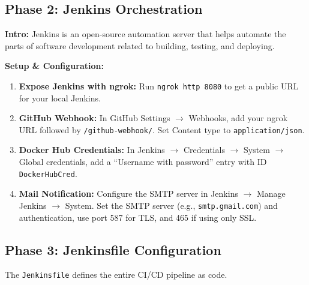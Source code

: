 \documentclass[12pt,a4paper]{article}
\begin{document}

\subsection{Phase 2: Jenkins Orchestration}

\textbf{Intro:} Jenkins is an open-source automation server that helps automate the parts of software development related to building, testing, and deploying.

\textbf{Setup \& Configuration:}
\begin{enumerate}[noitemsep]
  \item \textbf{Expose Jenkins with ngrok:} Run \texttt{ngrok http 8080} to get a public URL for your local Jenkins. %
  \item \textbf{GitHub Webhook:} In GitHub Settings $\rightarrow$ Webhooks, add your ngrok URL followed by \texttt{/github-webhook/}. Set Content type to \texttt{application/json}. %
  \item \textbf{Docker Hub Credentials:} In Jenkins $\rightarrow$ Credentials $\rightarrow$ System $\rightarrow$ Global credentials, add a ``Username with password'' entry with ID \texttt{DockerHubCred}. %
  \item \textbf{Mail Notification:} Configure the SMTP server in Jenkins $\rightarrow$ Manage Jenkins $\rightarrow$ System. Set the SMTP server (e.g., \texttt{smtp.gmail.com}) and authentication, use port 587 for TLS, and 465 if using only SSL. %
\end{enumerate}

\subsection{Phase 3: Jenkinsfile Configuration}

The \texttt{Jenkinsfile} defines the entire CI/CD pipeline as code.
\end{document}
